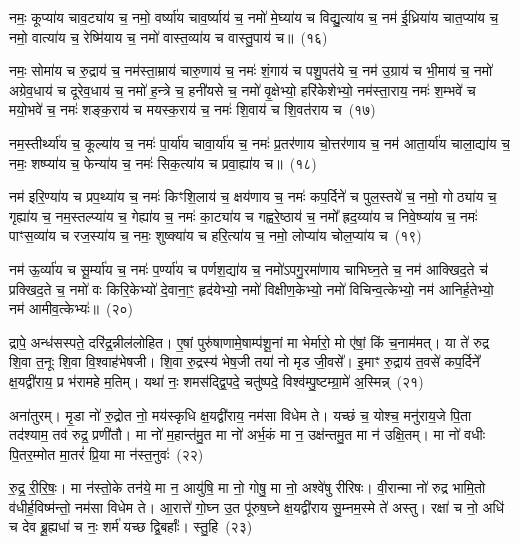 नमः॒ कूप्या॑य चाव॒ट्या॑य च॒ नमो॒ वर्ष्या॑य चाव॒र्ष्याय॑ च॒ नमो॑ मे॒घ्या॑य च विद्यु॒त्या॑य च॒ नम॑ ई॒ध्रिया॑य चात॒प्या॑य च॒ नमो॒ वात्या॑य च॒ रेष्मि॑याय च॒ नमो॑ वास्त॒व्या॑य च वास्तु॒पाय॑ च॥~(१६)

{\anuvakamend[{वै॒श॒न्ताय॑ च त्रि॒ꣳ॒शच्च॑}]}%

नमः॒ सोमा॑य च रु॒द्राय॑ च॒ नम॑स्ता॒म्राय॑ चारु॒णाय॑ च॒ नमः॑ शं॒गाय॑ च पशु॒पत॑ये च॒ नम॑ उ॒ग्राय॑ च भी॒माय॑ च॒ नमो॑ अग्रेव॒धाय॑ च दूरेव॒धाय॑ च॒ नमो॑ ह॒न्त्रे च॒ हनी॑यसे च॒ नमो॑ वृ॒क्षेभ्यो॒ हरि॑केशेभ्यो॒ नम॑स्ता॒राय॒ नमः॑ श॒म्भवे॑ च मयो॒भवे॑ च॒ नमः॑ शङ्क॒राय॑ च मयस्क॒राय॑ च॒ नमः॑ शि॒वाय॑ च शि॒वत॑राय च~(१७)

नम॒स्तीर्थ्या॑य च॒ कूल्या॑य च॒ नमः॑ पा॒र्या॑य चावा॒र्या॑य च॒ नमः॑ प्र॒तर॑णाय चो॒त्तर॑णाय च॒ नम॑ आता॒र्या॑य चाला॒द्या॑य च॒ नमः॒ शष्प्या॑य च॒ फेन्या॑य च॒ नमः॑ सिक॒त्या॑य च प्रवा॒ह्या॑य च॥~(१८)

{\anuvakamend[{शि॒वत॑राय च त्रि॒ꣳ॒शच्च॑}]}%

नम॑ इरि॒ण्या॑य च प्रप॒थ्या॑य च॒ नमः॑ किꣳशि॒लाय॑ च॒ क्षय॑णाय च॒ नमः॑ कप॒र्दिने॑ च पुल॒स्तये॑ च॒ नमो॒ गोठ्या॑य च॒ गृह्या॑य च॒ नम॒स्तल्प्या॑य च॒ गेह्या॑य च॒ नमः॑ का॒ट्या॑य च गह्वरे॒ष्ठाय॑ च॒ नमो᳚ ह्रद॒य्या॑य च निवे॒ष्प्या॑य च॒ नमः॑ पाꣳस॒व्या॑य च रज॒स्या॑य च॒ नमः॒ शुष्क्या॑य च हरि॒त्या॑य च॒ नमो॒ लोप्या॑य चोल॒प्या॑य च~(१९)

नम॑ ऊ॒र्व्या॑य च सू॒र्म्या॑य च॒ नमः॑ प॒र्ण्या॑य च पर्णश॒द्या॑य च॒ नमो॑\-ऽपगु॒रमा॑णाय चाभिघ्न॒ते च॒ नम॑ आक्खिद॒ते च॑ प्रक्खिद॒ते च॒ नमो॑ वः किरि॒केभ्यो॑ दे॒वाना॒ꣳ॒ हृद॑येभ्यो॒ नमो॑ विक्षीण॒केभ्यो॒ नमो॑ विचिन्व॒त्केभ्यो॒ नम॑ आनिर्\mbox{}ह॒तेभ्यो॒ नम॑ आमीव॒त्केभ्यः॑॥~(२०)

{\anuvakamend[{उ॒ल॒प्या॑य च॒ त्रय॑स्त्रिꣳशच्च}]}%

द्रापे॒ अन्ध॑सस्पते॒ दरि॑द्र॒न्नील॑लोहित। ए॒षां पुरु॑षाणामे॒षाम्प॑शू॒नां मा भेर्मारो॒ मो ए॑षां॒ किं च॒नाम॑मत्। या ते॑ रुद्र शि॒वा त॒नूः शि॒वा वि॒श्वाह॑भेषजी। शि॒वा रु॒द्रस्य॑ भेष॒जी तया॑ नो मृड जी॒वसे᳚। इ॒माꣳ रु॒द्राय॑ त॒वसे॑ कप॒र्दिने᳚ क्ष॒यद्वी॑राय॒ प्र भ॑रामहे म॒तिम्। यथा॑ नः॒ शमस॑द्द्वि॒पदे॒ चतु॑ष्पदे॒ विश्व॑म्पु॒ष्टम्ग्रा॒मे॑ अ॒स्मिन्न्~(२१)

अना॑तुरम्। मृ॒डा नो॑ रु॒द्रोत नो॒ मय॑स्कृधि क्ष॒यद्वी॑राय॒ नम॑सा विधेम ते। यच्छं च॒ योश्च॒ मनु॑राय॒जे पि॒ता तद॑श्याम॒ तव॑ रुद्र॒ प्रणी॑तौ। मा नो॑ म॒हान्त॑मु॒त मा नो॑ अर्भ॒कं मा न॒ उक्ष॑न्तमु॒त मा न॑ उक्षि॒तम्। मा नो॑ वधीः पि॒तर॒म्मोत मा॒तरं॑ प्रि॒या मा न॑स्त॒नुवः॑~(२२)

रु॒द्र॒ री॒रि॒षः॒। मा न॑स्तो॒के तन॑ये॒ मा न॒ आयु॑षि॒ मा नो॒ गोषु॒ मा नो॒ अश्वे॑षु रीरिषः। वी॒रान्मा नो॑ रुद्र भामि॒तो व॑धीर्\mbox{}ह॒विष्म॑न्तो॒ नम॑सा विधेम ते। आ॒रात्ते॑ गो॒घ्न उ॒त पू॑रुष॒घ्ने क्ष॒यद्वी॑राय सु॒म्नम॒स्मे ते॑ अस्तु। रक्षा॑ च नो॒ अधि॑ च देव ब्रू॒ह्यधा॑ च नः॒ शर्म॑ यच्छ द्वि॒बर्\mbox{}हाः᳚। स्तु॒हि~(२३)

